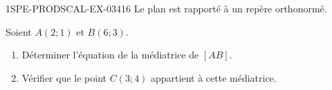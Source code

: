 \begin{exercice}{1SPE-PRODSCAL-EX-034}{1}{6}
Le plan est rapporté à un repère orthonormé.

Soient $A(2; 1)$ et $B(6; 3)$.
\begin{enumerate}
  \item Déterminer l'équation de la médiatrice de $[AB]$.
  \item Vérifier que le point $C(3; 4)$ appartient à cette médiatrice.
\end{enumerate}
\end{exercice}
